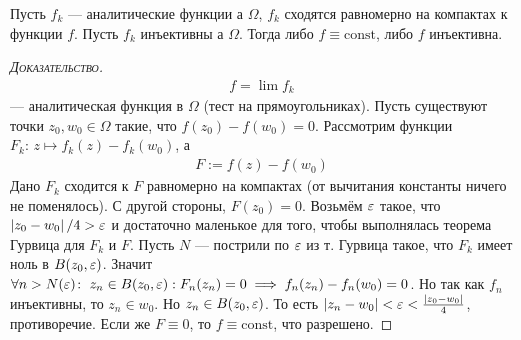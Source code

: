 \documentclass[../complex-analysis.tex]{subfiles}
\begin{document}
 \begin{thm}
  Пусть $ f_k $ --- аналитические функции а $ \Omega $, $ f_k $ сходятся равномерно на компактах к функции $ f $. Пусть $ f_k $ инъективны а $ \Omega $. Тогда либо $ f \equiv \mathrm{const} $, либо $ f $ инъективна.
 \end{thm}
 \begin{proof}[\normalfont\textsc{Доказательство}]
  \begin{align*}
   f = \lim f_k
  \end{align*} --- аналитическая функция в $ \Omega $ (тест на прямоугольниках). Пусть существуют точки $ z_0,w_0 \in \Omega $ такие, что $ f(z_0) - f(w_0) = 0 $. Рассмотрим функции $ F_k \colon\, z \mapsto f_k(z) - f_k(w_0) $, а
  \begin{align*}
   F := f(z) - f(w_0)
  \end{align*} Дано $F_k$ сходится к $ F $ равномерно на компактах (от вычитания константы ничего не поменялось). С другой стороны, $ F(z_0) = 0 $. Возьмём $ \varepsilon $ такое, что $ \left| z_0 - w_0 \right| / 4 > \varepsilon $ и достаточно маленькое для того, чтобы выполнялась теорема Гурвица для $ F_k $ и $ F $. Пусть $ N $ --- пострили по $ \varepsilon $ из т. Гурвица такое, что $ F_k $ имеет ноль в $ B(z_0, \varepsilon) $. Значит $ \forall n > N(\varepsilon) \colon\; z_n \in B(z_0,\varepsilon): F_n(z_n) = 0 \implies f_n(z_n) - f_n(w_0) = 0 $. Но так как $ f_n $ инъективны, то $ z_n \in w_0 $. Но $ z_n \in B(z_0, \varepsilon) $. То есть $ \left|z_n - w_0 \right| < \varepsilon < \frac{\left| z_0-w_0 \right|}{4} $, противоречие. Если же $ F \equiv 0 $, то $ f \equiv \mathrm{const} $, что разрешено.
 \end{proof}
 
\end{document}
